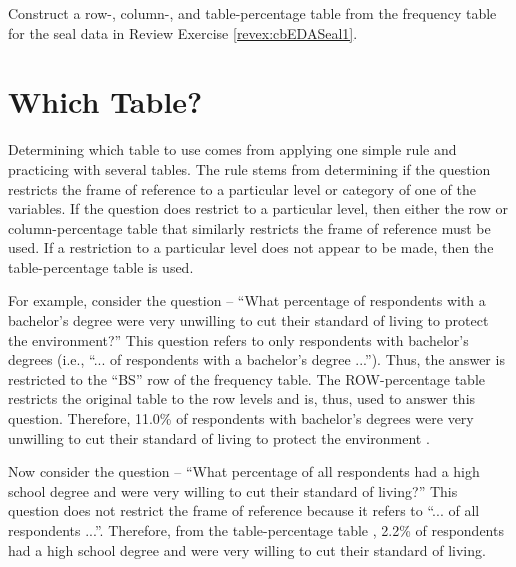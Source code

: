 \documentclass[10pt,openany]{book}\usepackage[]{graphicx}\usepackage[]{color}
\begin{document}

\vspace{-12pt}

\begin{exsection}
  \item \label{revex:cbEDASeal2} Construct a row-, column-, and table-percentage table from the frequency table for the seal data in Review Exercise \ref{revex:cbEDASeal1}. 
\end{exsection}


\vspace{-12pt}
\section{Which Table?}
\vspace{-12pt}
Determining which table to use comes from applying one simple rule and practicing with several tables.  The rule stems from determining if the question restricts the frame of reference to a particular level or category of one of the variables.  If the question does restrict to a particular level, then either the row or column-percentage table that similarly restricts the frame of reference must be used.  If a restriction to a particular level does not appear to be made, then the table-percentage table is used.

For example, consider the question -- ``What percentage of respondents with a bachelor's degree were very unwilling to cut their standard of living to protect the environment?''  This question refers to only respondents with bachelor's degrees (i.e., ``... of respondents with a bachelor's degree ...'').  Thus, the answer is restricted to the ``BS'' row of the frequency table.  The ROW-percentage table restricts the original table to the row levels and is, thus, used to answer this question.  Therefore, 11.0\% of respondents with bachelor's degrees were very unwilling to cut their standard of living to protect the environment .

Now consider the question -- ``What percentage of all respondents had a high school degree and were very willing to cut their standard of living?''  This question does not restrict the frame of reference because it refers to ``... of all respondents ...''.  Therefore, from the table-percentage table , 2.2\% of respondents had a high school degree and were very willing to cut their standard of living.
\end{document}
